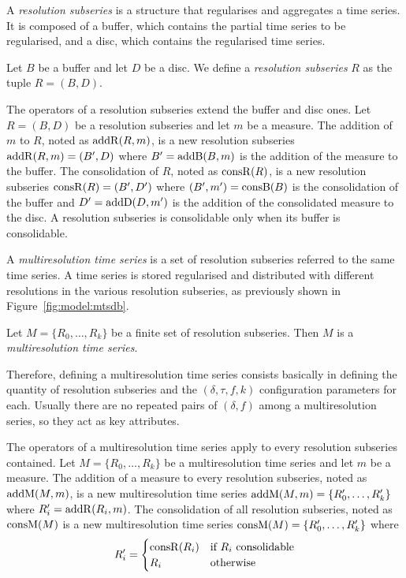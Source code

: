 A \emph{resolution subseries} is a structure that regularises and
aggregates a time series. It is composed of a buffer, which contains
the partial time series to be regularised, and a disc, which contains
the regularised time series.

\begin{definition}%
  Let $B$ be a buffer and let $D$ be a disc.  We define a
  \emph{resolution subseries} $R$ as the tuple $R=(B,D)$.  
\end{definition}
 
The operators of a resolution subseries extend the buffer and disc
ones. Let $R=(B,D)$ be a resolution subseries and let $m$ be a
measure.  The addition of $m$ to $R$, noted as $\operatorname{addR}(R,m)$, is a new
resolution subseries $\operatorname{addR}(R,m)=(B',D)$ where $B'= \operatorname{addB}(B,m)$ is the
addition of the measure to the buffer.  The consolidation of $R$,
noted as $\operatorname{consR}(R)$, is a new resolution subseries
$\operatorname{consR}(R)=(B',D')$ where $(B',m') = \operatorname{consB}(B)$ is the consolidation
of the buffer and $D'= \operatorname{addD}(D,m')$ is the addition of the
consolidated measure to the disc. A resolution subseries is
consolidable only when its buffer is consolidable.




A \emph{multiresolution time series} is a set of resolution subseries
referred to the same time series. A time series is stored regularised
and distributed with different resolutions in the various resolution
subseries, as previously shown in Figure~\ref{fig:model:mtsdb}.

\begin{definition}%
  Let $M=\{R_0, \dots, R_k\}$ be a finite set of resolution
  subseries. Then $M$ is a \emph{multiresolution time series}.
\end{definition}

Therefore, defining a multiresolution time series consists basically
in defining the quantity of resolution subseries and the
$(\delta,\tau,f,k)$ configuration parameters for each.  Usually there
are no repeated pairs of $(\delta,f)$ among a multiresolution
series, so they act as key attributes.

The operators of a multiresolution time series apply to every
resolution subseries contained. Let $M=\{R_0,\allowbreak
\dots,\allowbreak R_k\}$ be a multiresolution time series and let $m$
be a measure.
%
The addition of a measure to every resolution subseries, noted as
$\operatorname{addM}(M,m)$, is a new multiresolution time series $\operatorname{addM}(M,m)=\{R'_0,
\dots,\allowbreak R'_k\}$ where $R'_i=\operatorname{addR}(R_i,m)$. The consolidation
of all resolution subseries, noted as $\operatorname{consM}(M)$ is a new
multiresolution time series $\operatorname{consM}(M)=\{R'_0,\allowbreak
\dots,\allowbreak R'_k\}$ where 
\[R'_i=
\begin{cases}
\operatorname{consR}(R_i) & \text{if } R_i \text{ consolidable}\\
 R_i & \text{otherwise}
\end{cases}
\]

